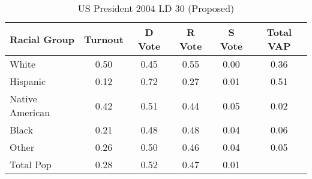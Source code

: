 \begin{table}[htb]
\begin{center}
\caption{US President 2004 LD 30 (Proposed)}
\label{pres04_vap_ld_30}
\begin{tabular}{lccccc}
  \hline
Racial Group & Turnout & D Vote & R Vote & S Vote & Total VAP \\ 
  \hline
White & 0.50 & 0.45 & 0.55 & 0.00 & 0.36 \\ 
  Hispanic & 0.12 & 0.72 & 0.27 & 0.01 & 0.51 \\ 
  Native American & 0.42 & 0.51 & 0.44 & 0.05 & 0.02 \\ 
  Black & 0.21 & 0.48 & 0.48 & 0.04 & 0.06 \\ 
  Other & 0.26 & 0.50 & 0.46 & 0.04 & 0.05 \\ 
  Total Pop & 0.28 & 0.52 & 0.47 & 0.01 &  \\ 
   \hline
\end{tabular}
\end{center}
\end{table}
